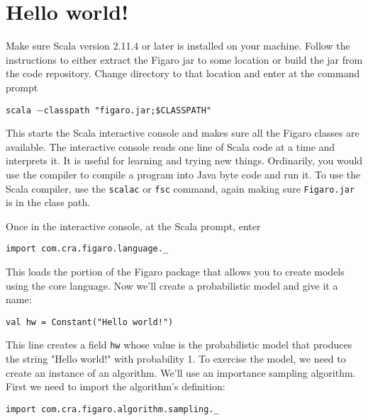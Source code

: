 
\chapter{Hello world!} %

\label{Hello world!} %


Make sure Scala version 2.11.4 or later is installed on your machine. Follow the instructions to either extract the Figaro jar to some location or build the jar from the code repository. Change directory to that location and enter at the command prompt

\begin{flushleft}
\texttt{scala $-$classpath "figaro.jar;\$CLASSPATH"}
\end{flushleft}

This starts the Scala interactive console and makes sure all the Figaro classes are available. The interactive console reads one line of Scala code at a time and interprets it. It is useful for learning and trying new things. Ordinarily, you would use the compiler to compile a program into Java byte code and run it. To use the Scala compiler, use the \texttt{scalac} or  \texttt{fsc} command, again making sure \texttt{Figaro.jar} is in the class path.

Once in the interactive console, at the Scala prompt, enter

\begin{flushleft}
\texttt{import com.cra.figaro.language.\_}
\end{flushleft}

This loads the portion of the Figaro package that allows you to create models using the core language. Now we'll create a probabilistic model and give it a name:

\begin{flushleft}
\texttt{val hw = Constant("Hello world!")}
\end{flushleft}

This line creates a field \texttt{hw} whose value is the probabilistic model that produces the string "Hello world!" with probability 1. To exercise the model, we need to create an instance of an algorithm. We'll use an importance sampling algorithm. First we need to import the algorithm's definition:

\begin{flushleft}
\texttt{import com.cra.figaro.algorithm.sampling.\_}
\end{flushleft}

